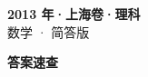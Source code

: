 \documentclass[zihao=-4, a4paper]{ctexart}
\begin{document}
\begin{center}
  {\Large\bfseries 2013 年·上海卷·理科}\\[4pt]
  {\large 数学 · 简答版}
\end{center}
\medskip
{}

\clearpage
{}
\begin{center}{\Large\bfseries 答案速查}\end{center}
\medskip

\end{document}
